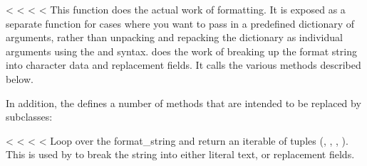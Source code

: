 \documentclass[letterpaper,10pt,english]{sphinxmanual}
\begin{document}
\begin{fulllineitems}
\begin{fulllineitems}
\label{\detokenize{string:string.Formatter.vformat}}
<%
\pysigstartsignatures
<%
<%
<%
This function does the actual work of formatting.  It is exposed as a
separate function for cases where you want to pass in a predefined
dictionary of arguments, rather than unpacking and repacking the
dictionary as individual arguments using the  and 
syntax.  {\hyperref[\detokenize{string:string.Formatter.vformat}]{}} does the work of breaking up the format string
into character data and replacement fields.  It calls the various
methods described below.

\end{fulllineitems}


In addition, the {\hyperref[\detokenize{string:string.Formatter}]{}} defines a number of methods that are
intended to be replaced by subclasses:

\vspace{5px}

\begin{fulllineitems}
\label{\detokenize{string:string.Formatter.parse}}
<%
\pysigstartsignatures
<%
<%
<%
Loop over the format\_string and return an iterable of tuples
(, , , ).  This is used
by {\hyperref[\detokenize{string:string.Formatter.vformat}]{}} to break the string into either literal text, or
replacement fields.


\end{fulllineitems}
\end{fulllineitems}
\end{document}
